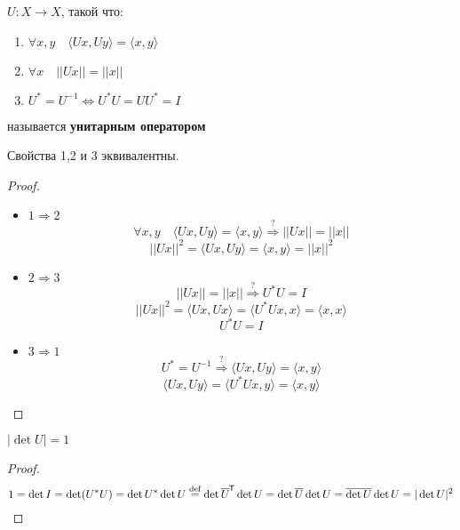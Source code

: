

\cfoot{}

\renewcommand{\thesubsection}{\arabic{subsection}.}
\makeatletter
\renewcommand*{\@seccntformat}[1]{\csname the#1\endcsname\hspace{0.1cm}}
\makeatother




\begin{definition}
    $U : X\to X$, такой что:
    \begin{enumerate}
        \item $\forall x,y \quad \langle Ux, Uy \rangle = \langle x, y\rangle$
        \item $\forall x \quad ||Ux||=||x||$
        \item $U^* = U^{-1} \Leftrightarrow U^*U=UU^*=I$
    \end{enumerate}
    называется \textbf{унитарным оператором}
\end{definition}

\begin{theorem}
    Свойства 1,2 и 3 эквивалентны.
\end{theorem}
\begin{proof}
    \begin{itemize}
        \item $1\Rightarrow 2$
              $$\forall x,y \quad \langle Ux, Uy \rangle = \langle x, y\rangle \stackrel{?}{\Rightarrow} ||Ux||=||x||$$
              $$||Ux||^2 = \langle Ux, Uy \rangle = \langle x, y\rangle = ||x||^2$$
        \item $2\Rightarrow 3$
              $$||Ux||=||x|| \stackrel{?}{\Rightarrow} U^*U=I$$
              $$||Ux||^2 = \langle Ux, Ux \rangle = \langle U^*Ux, x \rangle = \langle x, x\rangle$$
              $$U^*U=I$$
        \item $3\Rightarrow 1$
              $$U^*=U^{-1} \stackrel{?}{\Rightarrow} \langle Ux, Uy \rangle = \langle x, y\rangle$$
              $$\langle Ux, Uy \rangle = \langle U^*Ux, y \rangle = \langle x, y\rangle$$
    \end{itemize}
\end{proof}
\begin{lemma}
    $|\det U| = 1$
\end{lemma}
\begin{proof}
    $$1 = \det I = \det(U^*U)=\det U^* \det U \stackrel{\text{def}}{=} \det \overline U^{\mkern-1.5mu\mathsf{T}} \det U = \det \overline U \det U=\overline {\det U} \det U = |\det U|^2$$
\end{proof}

